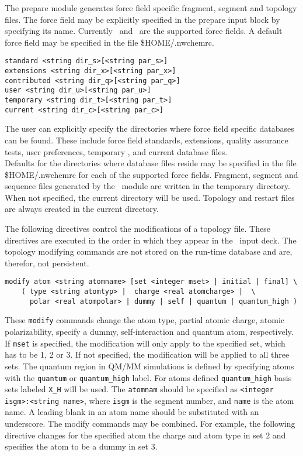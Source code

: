 The prepare module generates force field specific fragment, segment and 
topology files. The force field may be explicitly specified in the prepare 
input block by specifying its name.
Currently \amber\ and \charmm\ are the supported force fields.
A default force field may be specified in the file \$HOME/.nwchemrc. 

\begin{verbatim}
standard <string dir_s>[<string par_s>]
extensions <string dir_x>[<string par_x>]
contributed <string dir_q>[<string par_q>]
user <string dir_u>[<string par_u>]
temporary <string dir_t>[<string par_t>]
current <string dir_c>[<string par_c>]
\end{verbatim}

The user can explicitly specify the directories where force field
specific databases can be found. These include force field standards,
extensions, quality assurance tests, user preferences, temporary , and
current database files.\\
Defaults for the directories where database files reside may be specified 
in the file \$HOME/.nwchemrc for each of the supported force fields. 
Fragment, segment and sequence files generated by the \prepare\ module are 
written in the temporary directory. When not specified, the current 
directory will be used. 
Topology and restart files are always created in the current directory.


The following directives control the modifications of a
topology file. These directives are executed in the order in which 
they appear in the \prepare\ input deck. The topology modifying
commands are not stored on the run-time database and are, therefor,
not persistent.

\begin{verbatim}
modify atom <string atomname> [set <integer mset> | initial | final] \
	( type <string atomtyp> |  charge <real atomcharge> |  \
	  polar <real atompolar> | dummy | self | quantum | quantum_high )
\end{verbatim}

These \verb+modify+ commands change the atom type, partial atomic charge,
atomic polarizability, specify a dummy, self-interaction and quantum atom,
respectively. If \verb+mset+ is specified, the modification will only
apply to the specified set, which has to be 1, 2 or 3. If not specified,
the modification will be applied to all three sets. The quantum region in
QM/MM simulations is defined by specifying atoms with the \verb+quantum+
or \verb+quantum_high+ label. For atoms defined \verb+quantum_high+
basis sets labeled \verb+X_H+ will be used.
The \verb+atomnam+
should be specified as \verb+<integer isgm>:<string name>+, where
\verb+isgm+ is the segment number, and \verb+name+ is the atom name. A
leading blank in an atom name should be substituted with an underscore.
The modify commands may be combined. For example, the following directive
changes for the specified atom the charge and atom type in set 2 and 
specifies the atom to be a dummy in set 3.

